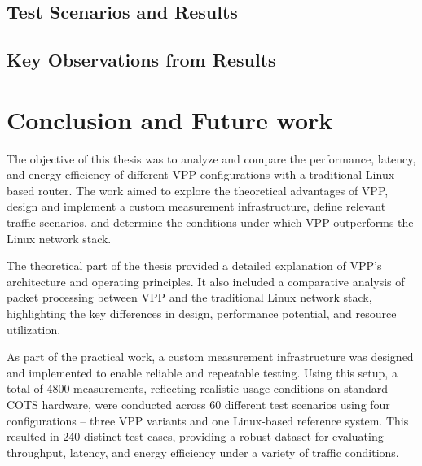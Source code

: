 \section{Test Scenarios and Results}





\section{Key Observations from Results}



\chapter{Conclusion and Future work}
The objective of this thesis was to analyze and compare the performance, latency, and energy efficiency of different VPP configurations with a traditional Linux-based router. 
The work aimed to explore the theoretical advantages of VPP, design and implement a custom measurement infrastructure, define relevant traffic scenarios, 
and determine the conditions under which VPP outperforms the Linux network stack.

The theoretical part of the thesis provided a detailed explanation of VPP's architecture and operating principles. 
It also included a comparative analysis of packet processing between VPP and the traditional Linux network stack, highlighting the key differences in design, performance potential, and resource utilization.

As part of the practical work, a custom measurement infrastructure was designed and implemented to enable reliable and repeatable testing. 
Using this setup, a total of 4800 measurements, reflecting realistic usage conditions on standard COTS hardware, 
were conducted across 60 different test scenarios using four configurations -- three VPP variants and one Linux-based reference system.
This resulted in 240 distinct test cases, providing a robust dataset for evaluating throughput, latency, and energy efficiency under a variety of traffic conditions.


